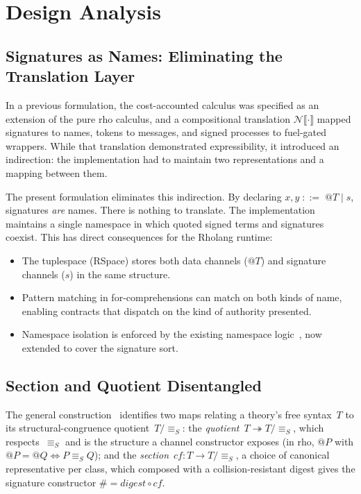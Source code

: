 \documentclass[11pt,a4paper]{article}
\makeatletter
\newcommand{\lsem}{\llbracket}
\newcommand{\rsem}{\rrbracket}
\newcommand{\quot}[1]{@#1}
\newcommand{\hashf}{\texttt{\#}}
\newcommand{\Seq}{\equiv_{\!S}}
\makeatother
\begin{document}
\section{Design Analysis}
\label{sec:analysis}

\subsection{Signatures as Names: Eliminating the Translation Layer}
\label{sec:sig-as-name}

In a previous formulation, the cost-accounted calculus was
specified as an extension of the pure rho calculus, and a
compositional translation $\mathcal{N}\lsem\cdot\rsem$ mapped
signatures to names, tokens to messages, and signed processes
to fuel-gated wrappers.  While that translation demonstrated
expressibility, it introduced an indirection: the
implementation had to maintain two representations and a mapping
between them.

The present formulation eliminates this indirection.  By
declaring $x, y \;::=\; \quot{T} \mid s$, signatures \emph{are}
names.  There is nothing to translate.  The implementation
maintains a single namespace in which quoted signed terms and
signatures coexist.  This has direct consequences for the
Rholang runtime:

\begin{itemize}[nosep]
  \item The tuplespace (RSpace) stores both data channels
    ($\quot{T}$) and signature channels ($s$) in the same
    structure.
  \item Pattern matching in for-comprehensions can match on
    both kinds of name, enabling contracts that dispatch on
    the kind of authority presented.
  \item Namespace isolation is enforced by the existing
    namespace logic~\cite{MeredithRadestock2005}, now extended
    to cover the signature sort.
\end{itemize}

\subsection{Section and Quotient Disentangled}
\label{sec:crypto-quote}

The general construction~\cite{CostEndofunctor} identifies two
maps relating a theory's free syntax~$T$ to its
structural-congruence quotient~$T/{\Seq}$: the
\emph{quotient}~$T \twoheadrightarrow T/{\Seq}$, which respects~$\Seq$
and is the structure a channel constructor exposes (in rho,
$\quot{P}$ with $\quot{P} = \quot{Q} \iff P \Seq Q$); and the
\emph{section}~$\mathit{cf} : T \to T/{\Seq}$, a choice of
canonical representative per class, which composed with a
collision-resistant digest gives the signature constructor
$\hashf = \mathit{digest} \circ \mathit{cf}$.
\end{document}

